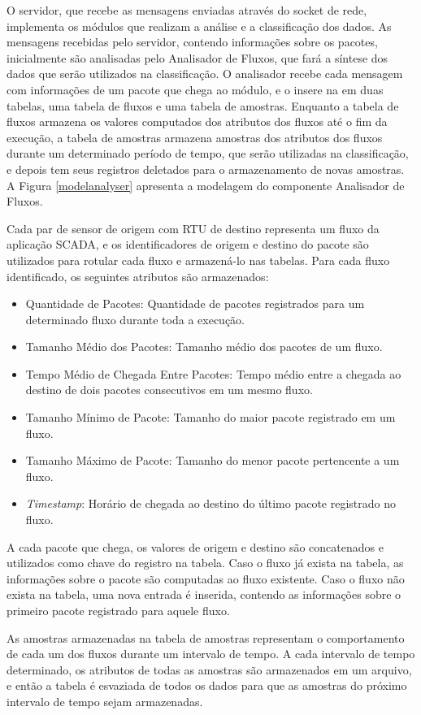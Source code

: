 \documentclass[cic,tc]{iiufrgs}
\begin{document}
O servidor, que recebe as mensagens enviadas através do socket de rede, implementa os módulos que realizam a análise e a classificação dos dados. As mensagens recebidas pelo servidor, contendo informações sobre os pacotes, inicialmente são analisadas pelo Analisador de Fluxos, que fará a síntese dos dados que serão utilizados na classificação. O analisador recebe cada mensagem com informações de um pacote que chega ao módulo, e o insere na em duas tabelas, uma tabela de fluxos e uma tabela de amostras. Enquanto a tabela de fluxos armazena os valores computados dos atributos dos fluxos até o fim da execução, a tabela de amostras armazena amostras dos atributos dos fluxos durante um determinado período de tempo, que serão utilizadas na classificação, e depois tem seus registros deletados para o armazenamento de novas amostras. A Figura \ref{modelanalyser} apresenta a modelagem do componente Analisador de Fluxos.

Cada par de sensor de origem com RTU de destino representa um fluxo da aplicação SCADA, e os identificadores de origem e destino do pacote são utilizados para rotular cada fluxo e armazená-lo nas tabelas. Para cada fluxo identificado, os seguintes atributos são armazenados:
\begin{itemize}
\item{Quantidade de Pacotes}: Quantidade de pacotes registrados para um determinado fluxo durante toda a execução.
\item{Tamanho Médio dos Pacotes}: Tamanho médio dos pacotes de um fluxo.  
\item{Tempo Médio de Chegada Entre Pacotes}: Tempo médio entre a chegada ao destino de dois pacotes consecutivos em um mesmo fluxo.
\item{Tamanho Mínimo de Pacote}: Tamanho do maior pacote registrado em um fluxo.
\item{Tamanho Máximo de Pacote}: Tamanho do menor pacote pertencente a um fluxo.
\item{\emph{Timestamp}}: Horário de chegada ao destino do último pacote registrado no fluxo.
\end{itemize}
A cada pacote que chega, os valores de origem e destino são concatenados e utilizados como chave do registro na tabela. Caso o fluxo já exista na tabela, as informações sobre o pacote são computadas ao fluxo existente. Caso o fluxo não exista na tabela, uma nova entrada é inserida, contendo as informações sobre o primeiro pacote registrado para aquele fluxo.

As amostras armazenadas na tabela de amostras representam o comportamento de cada um dos fluxos durante um intervalo de tempo. A cada intervalo de tempo determinado, os atributos de todas as amostras são armazenados em um arquivo, e então a tabela é esvaziada de todos os dados para que as amostras do próximo intervalo de tempo sejam armazenadas.
\end{document}
